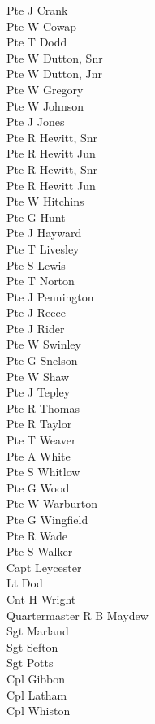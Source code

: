 \begin{multicols}{2}
  Pte J Crank \\
  Pte W Cowap \\
  Pte T Dodd \\
  Pte W Dutton, Snr \\
  Pte W Dutton, Jnr \\
  Pte W Gregory \\
  Pte W Johnson \\
  Pte J Jones \\
  Pte R Hewitt, Snr \\
  Pte R Hewitt Jun \\
  Pte R Hewitt, Snr \\
  Pte R Hewitt Jun \\
  Pte W Hitchins \\
  Pte G Hunt \\
  Pte J Hayward \\
  Pte T Livesley \\
  Pte S Lewis \\
  Pte T Norton \\
  Pte J Pennington \\
  Pte J Reece \\
  Pte J Rider \\
  Pte W Swinley \\
  Pte G Snelson \\
  Pte W Shaw \\
  Pte J Tepley \\
  Pte R Thomas \\
  Pte R Taylor \\
  Pte T Weaver \\
  Pte A White \\
  Pte S Whitlow \\
  Pte G Wood \\
  Pte W Warburton \\
  Pte G Wingfield \\
  Pte R Wade \\
  Pte S Walker \\
  Capt Leycester \\
  Lt Dod \\
  Cnt H Wright \\
  Quartermaster R B Maydew \\
  Sgt Marland \\
  Sgt Sefton \\
  Sgt Potts \\
  Cpl Gibbon \\
  Cpl Latham \\
  Cpl Whiston \\

\end{multicols}
